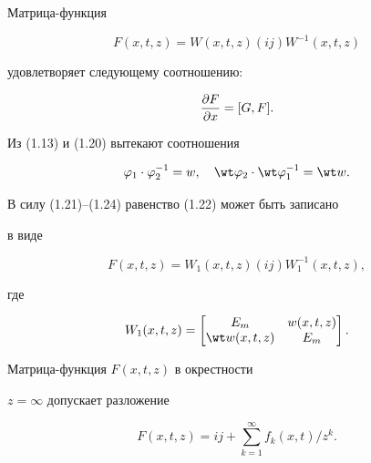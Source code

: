 \begin{cors} Матрица-функция 


\begin{equation} 


F(x,t,z)=W(x,t,z)(ij)W^{-1}(x,t,z) 


\end{equation} 


удовлетворяет следующему соотношению: 


\begin{equation} 


\myfrac{F}{x}=[G,F]. 


\end{equation} 


\end{cors} 


 


Из (1.13) и (1.20) вытекают соотношения 


\begin{equation} 


\varphi_1\cdot\varphi^{-1}_2=w,\quad \wt\varphi_2\cdot 


\wt\varphi^{-1}_1=\wt w. 


\end{equation} 


В силу (1.21)--(1.24) равенство (1.22) может быть записано 


в виде 


\begin{equation} 


F(x,t,z)=W_1(x,t,z)(ij)W^{-1}_1(x,t,z), 


\end{equation} 


где 


$$ 


W_1(x,t,z)= 


\begin{bmatrix} 


E_m & w(x,t,z) \\ 


\wt w(x,t,z) & E_m 


\end{bmatrix} 


. 


$$ 


 


\begin{cors} Матрица-функция $F(x,t,z)$ в окрестности 


$z=\infty$ допускает разложение 


\begin{equation} 


F(x,t,z)=ij+\sum^\infty_{k=1}f_k(x,t)/z^k. 


\end{equation} 


\end{cors} 


